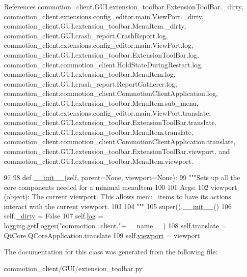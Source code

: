References commotion\+\_\+client.\+G\+U\+I.\+extension\+\_\+toolbar.\+Extension\+Tool\+Bar.\+\_\+dirty, commotion\+\_\+client.\+extensions.\+config\+\_\+editor.\+main.\+View\+Port.\+\_\+dirty, commotion\+\_\+client.\+G\+U\+I.\+extension\+\_\+toolbar.\+Menu\+Item.\+\_\+dirty, commotion\+\_\+client.\+G\+U\+I.\+crash\+\_\+report.\+Crash\+Report.\+log, commotion\+\_\+client.\+extensions.\+config\+\_\+editor.\+main.\+View\+Port.\+log, commotion\+\_\+client.\+G\+U\+I.\+extension\+\_\+toolbar.\+Extension\+Tool\+Bar.\+log, commotion\+\_\+client.\+commotion\+\_\+client.\+Hold\+State\+During\+Restart.\+log, commotion\+\_\+client.\+G\+U\+I.\+extension\+\_\+toolbar.\+Menu\+Item.\+log, commotion\+\_\+client.\+G\+U\+I.\+crash\+\_\+report.\+Report\+Gatherer.\+log, commotion\+\_\+client.\+commotion\+\_\+client.\+Commotion\+Client\+Application.\+log, commotion\+\_\+client.\+G\+U\+I.\+extension\+\_\+toolbar.\+Menu\+Item.\+sub\+\_\+menu, commotion\+\_\+client.\+extensions.\+config\+\_\+editor.\+main.\+View\+Port.\+translate, commotion\+\_\+client.\+G\+U\+I.\+extension\+\_\+toolbar.\+Extension\+Tool\+Bar.\+translate, commotion\+\_\+client.\+G\+U\+I.\+extension\+\_\+toolbar.\+Menu\+Item.\+translate, commotion\+\_\+client.\+commotion\+\_\+client.\+Commotion\+Client\+Application.\+translate, commotion\+\_\+client.\+G\+U\+I.\+extension\+\_\+toolbar.\+Extension\+Tool\+Bar.\+viewport, and commotion\+\_\+client.\+G\+U\+I.\+extension\+\_\+toolbar.\+Menu\+Item.\+viewport.


\begin{DoxyCode}
97 
98     \textcolor{keyword}{def }\hyperlink{classcommotion__client_1_1GUI_1_1extension__toolbar_1_1MenuItem_a111f98709fa79a9be8bdeed5722a9b69}{\_\_init\_\_}(self, parent=None, viewport=None):
99         \textcolor{stringliteral}{"""Sets up all the core components needed for a minimal menuItem}
100 \textcolor{stringliteral}{        }
101 \textcolor{stringliteral}{        Args:}
102 \textcolor{stringliteral}{          viewport (object): The current viewport. This allows menu\_items to have its actions interact with
       the current viewport.}
103 \textcolor{stringliteral}{        }
104 \textcolor{stringliteral}{        """}
105         super().\hyperlink{classcommotion__client_1_1GUI_1_1extension__toolbar_1_1MenuItem_a111f98709fa79a9be8bdeed5722a9b69}{\_\_init\_\_}()
106         self.\hyperlink{classcommotion__client_1_1GUI_1_1extension__toolbar_1_1MenuItem_a3e3264241df55c41099f5f0f638d40f6}{\_dirty} = \textcolor{keyword}{False}
107         self.\hyperlink{classcommotion__client_1_1GUI_1_1extension__toolbar_1_1MenuItem_a6984ce2f476f256d285f1517d9beead6}{log} = logging.getLogger(\textcolor{stringliteral}{"commotion\_client."}+\_\_name\_\_)
108         self.\hyperlink{classcommotion__client_1_1GUI_1_1extension__toolbar_1_1MenuItem_a0134e71e4901cc4eec9b50785cba7265}{translate} = QtCore.QCoreApplication.translate
109         self.\hyperlink{classcommotion__client_1_1GUI_1_1extension__toolbar_1_1MenuItem_a49032d0bb2b22e07d66a228d756d9350}{viewport} = viewport
        
\end{DoxyCode}


The documentation for this class was generated from the following file\+:\begin{DoxyCompactItemize}
\item 
commotion\+\_\+client/\+G\+U\+I/extension\+\_\+toolbar.\+py\end{DoxyCompactItemize}
